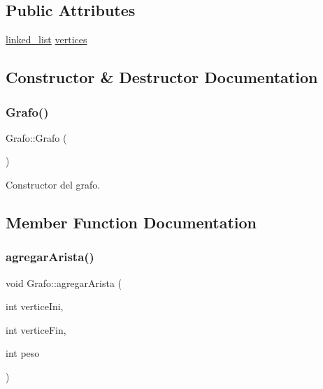 \subsection*{Public Attributes}
\begin{DoxyCompactItemize}
\item 
\hyperlink{classlinked__list}{linked\+\_\+list} \hyperlink{classGrafo_a616d168e63215c3c0051dc7504edeff1}{vertices}
\end{DoxyCompactItemize}


\subsection{Constructor \& Destructor Documentation}
\mbox{\label{classGrafo_ab810bbe26a98e9af6661ccddff66b03b}} 
\subsubsection{\texorpdfstring{Grafo()}{Grafo()}}
{\footnotesize\ttfamily Grafo\+::\+Grafo (\begin{DoxyParamCaption}{ }\end{DoxyParamCaption})}



Constructor del grafo. 



\subsection{Member Function Documentation}
\mbox{\label{classGrafo_a6265e95aef23ebedcbfd69d5b39cb9ea}} 
\subsubsection{\texorpdfstring{agregar\+Arista()}{agregarArista()}}
{\footnotesize\ttfamily void Grafo\+::agregar\+Arista (\begin{DoxyParamCaption}\item[{int}]{vertice\+Ini,  }\item[{int}]{vertice\+Fin,  }\item[{int}]{peso }\end{DoxyParamCaption})}



